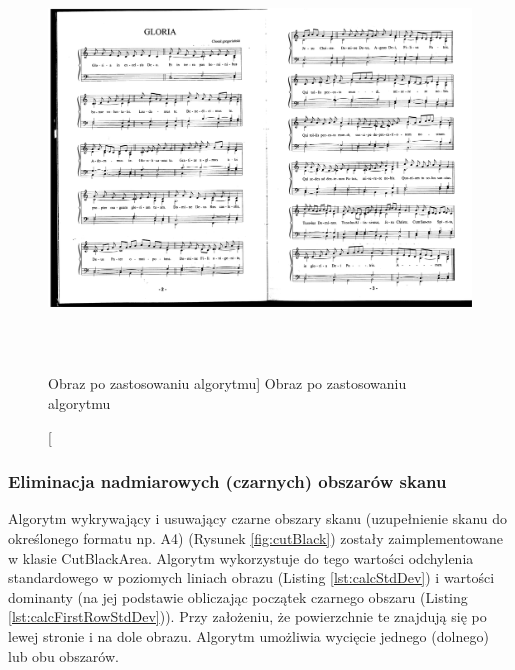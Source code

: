 \documentclass[a4paper,12pt]{article}
\newcommand\spacingIndent{2.2em}
\begin{document}
		        \begin{figure}[!ht]  
    			    \begin{center}
    				    \includegraphics[height=10.5cm, frame] {image//exampleImage//001_b.png} 
    			    \end{center}
	    		    \caption
    			        [Obraz po zastosowaniu algorytmu]  
	    		        {Obraz po zastosowaniu algorytmu}  
	            \end{figure}
		
		\subsubsection{Eliminacja nadmiarowych (czarnych) obszarów skanu}
			\hspace{\spacingIndent} 
			Algorytm wykrywający i usuwający czarne obszary skanu (uzupełnienie skanu do określonego formatu np. A4) (Rysunek \ref{fig:cutBlack}) zostały  zaimplementowane w klasie CutBlackArea. Algorytm wykorzystuje do tego           wartości odchylenia standardowego w poziomych liniach obrazu (Listing \ref{lst:calcStdDev}) i wartości     dominanty (na jej podstawie obliczając początek czarnego obszaru (Listing \ref{lst:calcFirstRowStdDev})). Przy założeniu, że powierzchnie te znajdują się po lewej         stronie i na dole obrazu. Algorytm umożliwia wycięcie jednego (dolnego)     lub obu obszarów. 
			
\end{document}
